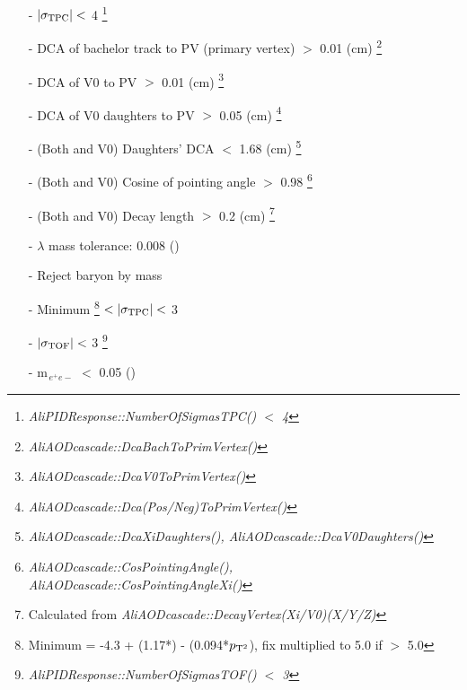 %
\begin{itemize}
    \small
    \item[]  \vspace{1pt}
    \item[-] $|\sigma_{\rm TPC}| <$ 4
     \footnote{\textit{AliPIDResponse::NumberOfSigmasTPC() $<$ 4}}
    \item[-] DCA of bachelor track to PV (primary vertex) $>$ 0.01 (cm)
     \footnote{\textit{AliAODcascade::DcaBachToPrimVertex()}}
    \item[-] DCA of V0 to PV $>$ 0.01 (cm)
     \footnote{\textit{AliAODcascade::DcaV0ToPrimVertex()}}
    \item[-] DCA of V0 daughters to PV $>$ 0.05 (cm)
     \footnote{\textit{AliAODcascade::Dca(Pos/Neg)ToPrimVertex()}}
    \item[-] (Both \Xim and V0) Daughters' DCA $<$ 1.68 (cm)
     \footnote{\textit{AliAODcascade::DcaXiDaughters(),
     AliAODcascade::DcaV0Daughters()}}
    \item[-] (Both \Xim and V0) Cosine of pointing angle $>$ 0.98
     \footnote{\textit{AliAODcascade::CosPointingAngle(),
     AliAODcascade::CosPointingAngleXi()}}
    \item[-] (Both \Xim and V0) Decay length $>$ 0.2 (cm)
     \footnote{Calculated from \textit{AliAODcascade::DecayVertex(Xi/V0)(X/Y/Z)}}
    \item[-] $\lambda$ mass tolerance: 0.008 (\GeVmass)
    \item[-] Reject \Omg baryon by mass
\end{itemize}
%
\clearpage
\begin{itemize}
    \small
    \item[]  \vspace{1pt}
    \item[-] Minimum \footnote{Minimum = {-4.3 + (1.17*\pt) - (0.094*\ensuremath{p_{\rm T^{2}}})},
    fix multiplied \pt to 5.0 if \pt $>$ 5.0} $< |\sigma_{\rm TPC}| <$ 3
    \item[-] $|\sigma_{\rm TOF}| <$ 3
     \footnote{\textit{AliPIDResponse::NumberOfSigmasTOF() $<$ 3}}
    \item[-] m$_{\,e^{+}e{-}}$ $<$ 0.05 (\GeVmass)
\end{itemize}
%

